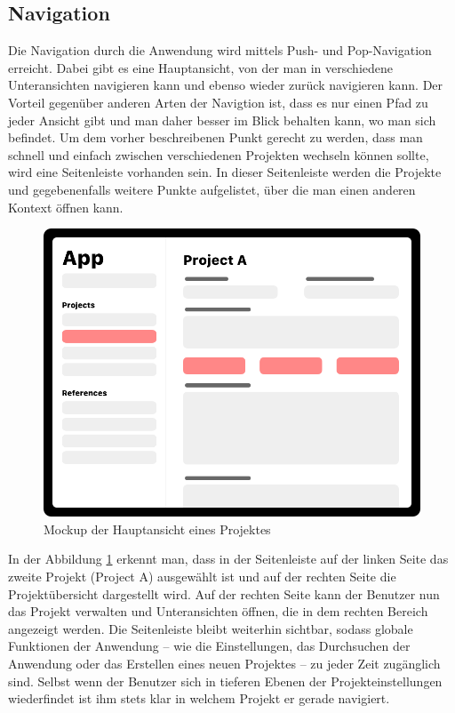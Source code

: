 \subsection{Navigation}
Die Navigation durch die Anwendung wird mittels Push- und Pop-Navigation erreicht.
Dabei gibt es eine Hauptansicht, von der man in verschiedene Unteransichten navigieren kann und ebenso wieder zurück navigieren kann.
Der Vorteil gegenüber anderen Arten der Navigtion ist, dass es nur einen Pfad zu jeder Ansicht gibt und man daher besser im Blick behalten kann, wo man sich befindet.
%
Um dem vorher beschreibenen Punkt gerecht zu werden, dass man schnell und einfach zwischen verschiedenen Projekten wechseln können sollte, wird eine Seitenleiste vorhanden sein.
In dieser Seitenleiste werden die Projekte und gegebenenfalls weitere Punkte aufgelistet, über die man einen anderen Kontext öffnen kann.
\begin{figure}[h!]
	\centering
	\vspace{15pt}
	\includegraphics[scale=0.4]{images/design-app}
	\caption{Mockup der Hauptansicht eines Projektes}
	\label{fig:design-app}
\end{figure}
In der Abbildung \ref{fig:design-app} erkennt man, dass in der Seitenleiste auf der linken Seite das zweite Projekt (Project A) ausgewählt ist und auf der rechten Seite die Projektübersicht dargestellt wird.
Auf der rechten Seite kann der Benutzer nun das Projekt verwalten und Unteransichten öffnen, die in dem rechten Bereich angezeigt werden.
Die Seitenleiste bleibt weiterhin sichtbar, sodass globale Funktionen der Anwendung – wie die Einstellungen, das Durchsuchen der Anwendung oder das Erstellen eines neuen Projektes – zu jeder Zeit zugänglich sind.
Selbst wenn der Benutzer sich in tieferen Ebenen der Projekteinstellungen wiederfindet ist ihm stets klar in welchem Projekt er gerade navigiert.

